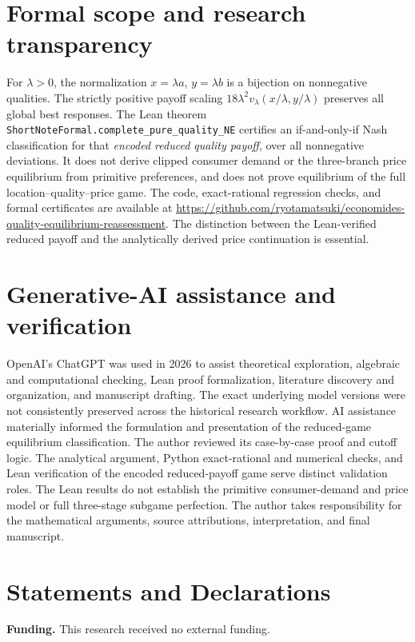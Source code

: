 \documentclass[11pt]{article}
\begin{document}
\section{Formal scope and research transparency}
\label{app:transparency}
For $\lambda>0$, the normalization
$x=\lambda a$, $y=\lambda b$ is
a bijection on nonnegative qualities.
The strictly positive payoff scaling
$18\lambda^2v_\lambda(x/\lambda,y/\lambda)$
preserves all global best responses.
The Lean theorem
\texttt{ShortNoteFormal.complete\_pure\_quality\_NE}
certifies an if-and-only-if Nash
classification for that \emph{encoded
reduced quality payoff}, over all
nonnegative deviations. It does not
derive clipped consumer demand or
the three-branch price equilibrium from
primitive preferences, and does not
prove equilibrium of the full
location--quality--price game.
The code, exact-rational regression checks,
and formal certificates are available at
\url{https://github.com/ryotamatsuki/economides-quality-equilibrium-reassessment}.
The distinction between the Lean-verified
reduced payoff and the analytically
derived price continuation is essential.

\section*{Generative-AI assistance and verification}
OpenAI's ChatGPT was used in 2026 to assist
theoretical exploration, algebraic and
computational checking, Lean proof
formalization, literature discovery and
organization, and manuscript drafting.
The exact underlying model versions were not
consistently preserved across the historical
research workflow. AI assistance materially
informed the formulation and presentation of
the reduced-game equilibrium classification.
The author reviewed its case-by-case proof and
cutoff logic. The analytical argument, Python
exact-rational and numerical checks, and Lean
verification of the encoded reduced-payoff
game serve distinct validation roles.
The Lean results do not establish the primitive
consumer-demand and price model or
full three-stage subgame perfection.
The author takes responsibility for the
mathematical arguments, source attributions,
interpretation, and final manuscript.

\section*{Statements and Declarations}
\noindent\textbf{Funding.} This research received no external funding.
\end{document}
